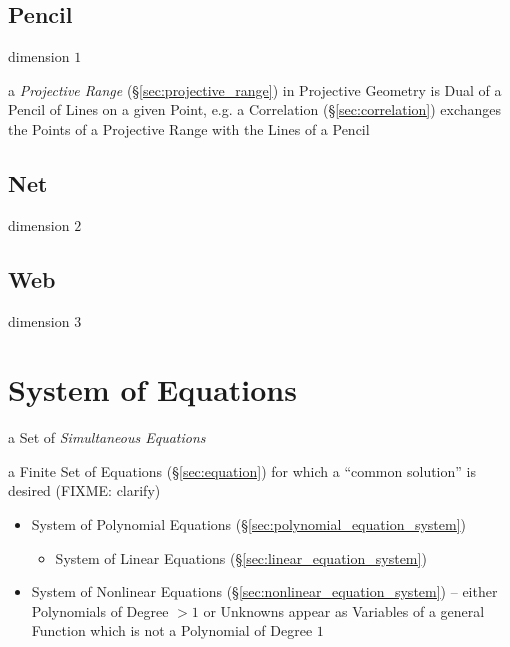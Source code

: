 \subsection{Pencil}\label{sec:pencil}

dimension $1$

\fist a \emph{Projective Range} (\S\ref{sec:projective_range}) in Projective
Geometry is Dual of a Pencil of Lines on a given Point, e.g. a Correlation
(\S\ref{sec:correlation}) exchanges the Points of a Projective Range with the
Lines of a Pencil



\subsection{Net}\label{sec:linear_divisor_net}

dimension $2$




\subsection{Web}\label{sec:web}

dimension $3$



\section{System of Equations}\label{sec:equation_system}

a Set of \emph{Simultaneous Equations}

a Finite Set of Equations (\S\ref{sec:equation}) for which a ``common
solution'' is desired (FIXME: clarify)

\begin{itemize}
  \item System of Polynomial Equations
    (\S\ref{sec:polynomial_equation_system})
  \begin{itemize}
    \item System of Linear Equations (\S\ref{sec:linear_equation_system})
  \end{itemize}
  \item System of Nonlinear Equations
    (\S\ref{sec:nonlinear_equation_system}) -- either Polynomials of Degree
    $>1$ or Unknowns appear as Variables of a general Function which is not a
    Polynomial of Degree $1$
\end{itemize}

